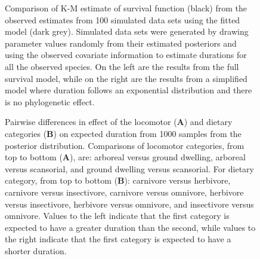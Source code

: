 \documentclass[12pt]{article}
\begin{document}

\clearpage


\begin{figure}[ht]
  \caption{Comparison of K-M estimate of survival function (black) from the observed estimates from 100 simulated data sets using the fitted model (dark grey). Simulated data sets were generated by drawing parameter values randomly from their estimated posteriors and using the observed covariate information to estimate durations for all the observed species. On the left are the results from the full survival model, while on the right are the results from a simplified model where duration follows an exponential distribution and there is no phylogenetic effect.}
  \label{fig:ppc_surv}
\end{figure}


\begin{figure}[ht]
  \caption{Pairwise differences in effect of the locomotor (\textbf{A}) and dietary categories (\textbf{B}) on expected duration from 1000 samples from the posterior distribution. Comparisons of locomotor categories, from top to bottom (\textbf{A}), are: arboreal versus ground dwelling, arboreal versus scansorial, and ground dwelling versus scansorial. For dietary category, from top to bottom (\textbf{B}): carnivore versus herbivore, carnivore versus insectivore, carnivore versus omnivore, herbivore versus insectivore, herbivore versus omnivore, and insectivore versus omnivore. Values to the left indicate that the first category is expected to have a greater duration than the second, while values to the right indicate that the first category is expected to have a shorter duration.}
  \label{fig:trait_est}
\end{figure}
\end{document}
